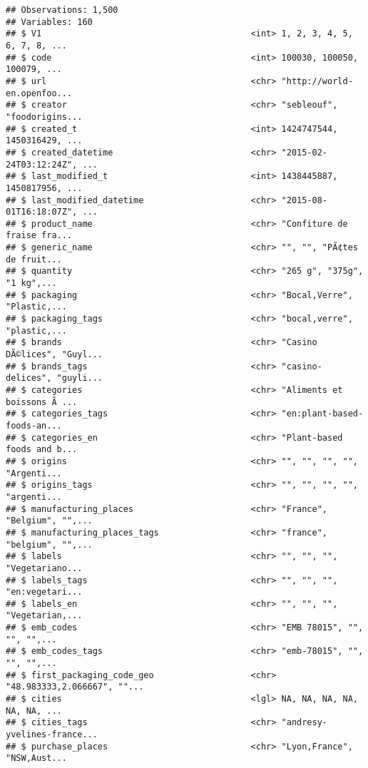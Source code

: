 \documentclass[]{article}
\begin{document}
\begin{verbatim}
## Observations: 1,500
## Variables: 160
## $ V1                                         <int> 1, 2, 3, 4, 5, 6, 7, 8, ...
## $ code                                       <int> 100030, 100050, 100079, ...
## $ url                                        <chr> "http://world-en.openfoo...
## $ creator                                    <chr> "sebleouf", "foodorigins...
## $ created_t                                  <int> 1424747544, 1450316429, ...
## $ created_datetime                           <chr> "2015-02-24T03:12:24Z", ...
## $ last_modified_t                            <int> 1438445887, 1450817956, ...
## $ last_modified_datetime                     <chr> "2015-08-01T16:18:07Z", ...
## $ product_name                               <chr> "Confiture de fraise fra...
## $ generic_name                               <chr> "", "", "PÃ¢tes de fruit...
## $ quantity                                   <chr> "265 g", "375g", "1 kg",...
## $ packaging                                  <chr> "Bocal,Verre", "Plastic,...
## $ packaging_tags                             <chr> "bocal,verre", "plastic,...
## $ brands                                     <chr> "Casino DÃ©lices", "Guyl...
## $ brands_tags                                <chr> "casino-delices", "guyli...
## $ categories                                 <chr> "Aliments et boissons Ã ...
## $ categories_tags                            <chr> "en:plant-based-foods-an...
## $ categories_en                              <chr> "Plant-based foods and b...
## $ origins                                    <chr> "", "", "", "", "Argenti...
## $ origins_tags                               <chr> "", "", "", "", "argenti...
## $ manufacturing_places                       <chr> "France", "Belgium", "",...
## $ manufacturing_places_tags                  <chr> "france", "belgium", "",...
## $ labels                                     <chr> "", "", "", "Vegetariano...
## $ labels_tags                                <chr> "", "", "", "en:vegetari...
## $ labels_en                                  <chr> "", "", "", "Vegetarian,...
## $ emb_codes                                  <chr> "EMB 78015", "", "", "",...
## $ emb_codes_tags                             <chr> "emb-78015", "", "", "",...
## $ first_packaging_code_geo                   <chr> "48.983333,2.066667", ""...
## $ cities                                     <lgl> NA, NA, NA, NA, NA, NA, ...
## $ cities_tags                                <chr> "andresy-yvelines-france...
## $ purchase_places                            <chr> "Lyon,France", "NSW,Aust...

\end{verbatim}
\end{document}
